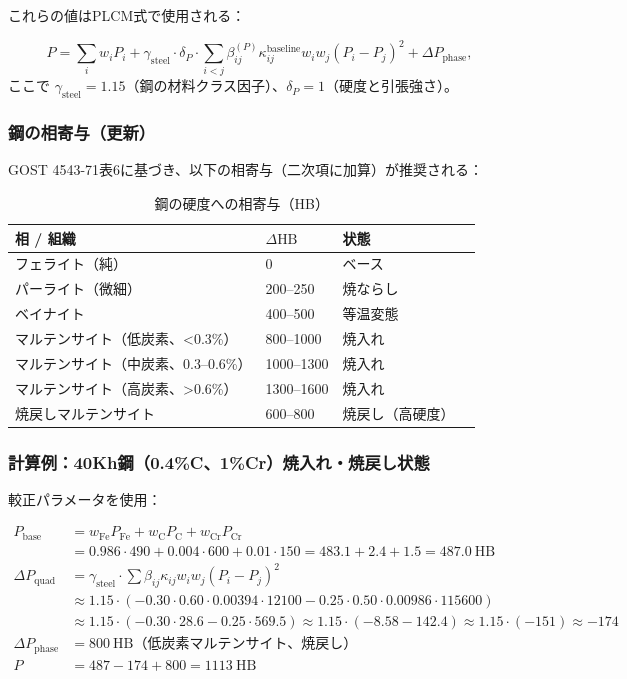 \documentclass[12pt,a4paper]{article}
\begin{document}
	これらの値はPLCM式で使用される：
	
	\[
	P = \sum_i w_i P_i + \gamma_{\text{steel}} \cdot \delta_P \cdot \sum_{i<j} \beta_{ij}^{(P)} \kappa_{ij}^{\text{baseline}} w_i w_j (P_i - P_j)^2 + \Delta P_{\text{phase}},
	\]
	ここで $\gamma_{\text{steel}} = 1.15$（鋼の材料クラス因子）、$\delta_P = 1$（硬度と引張強さ）。
	
	\subsubsection{鋼の相寄与（更新）}
	
	GOST 4543-71表6に基づき、以下の相寄与（二次項に加算）が推奨される：
	
	\begin{longtable}{p{3.5cm} p{3.0cm} p{3.0cm} p{4cm}}
		\caption{鋼の硬度への相寄与（HB）}\label{tab:steel_phase_contrib_gost4543}\\
		\toprule
		\textbf{相 / 組織} & $\Delta\text{HB}$ & \textbf{状態} \\
		\midrule
		フェライト（純） & 0 & ベース \\
		パーライト（微細） & 200–250 & 焼ならし \\
		ベイナイト & 400–500 & 等温変態 \\
		マルテンサイト（低炭素、<0.3\%） & 800–1000 & 焼入れ \\
		マルテンサイト（中炭素、0.3–0.6\%） & 1000–1300 & 焼入れ \\
		マルテンサイト（高炭素、>0.6\%） & 1300–1600 & 焼入れ \\
		焼戻しマルテンサイト & 600–800 & 焼戻し（高硬度） \\
		\bottomrule
	\end{longtable}
	
	\subsubsection{計算例：40Kh鋼（0.4\%C、1\%Cr）焼入れ・焼戻し状態}
	
	較正パラメータを使用：
	
	\[
	\begin{aligned}
		P_{\text{base}} &= w_{\text{Fe}} P_{\text{Fe}} + w_{\text{C}} P_{\text{C}} + w_{\text{Cr}} P_{\text{Cr}} \\
		&= 0.986\cdot490 + 0.004\cdot600 + 0.01\cdot150 = 483.1 + 2.4 + 1.5 = 487.0\ \text{HB} \\
		\Delta P_{\text{quad}} &= \gamma_{\text{steel}} \cdot \sum \beta_{ij} \kappa_{ij} w_i w_j (P_i-P_j)^2 \\
		&\approx 1.15 \cdot ( -0.30 \cdot 0.60 \cdot 0.00394 \cdot 12100 -0.25 \cdot 0.50 \cdot 0.00986 \cdot 115600 ) \\
		&\approx 1.15 \cdot ( -0.30 \cdot 28.6 -0.25 \cdot 569.5 ) \approx 1.15 \cdot ( -8.58 -142.4 ) \approx 1.15 \cdot (-151) \approx -174 \\
		\Delta P_{\text{phase}} &= 800\ \text{HB（低炭素マルテンサイト、焼戻し）} \\
		P &= 487 - 174 + 800 = 1113\ \text{HB}
	\end{aligned}
	\]
	
\end{document}
